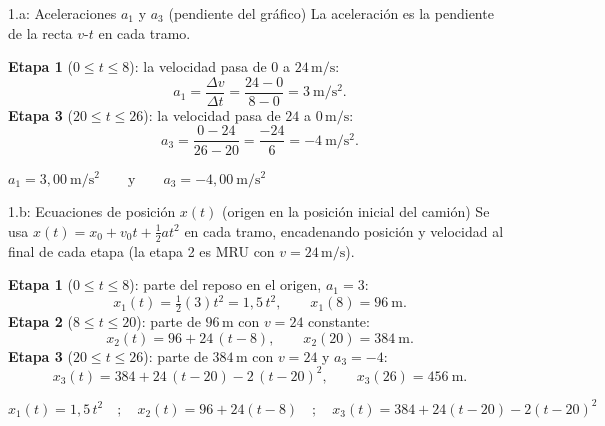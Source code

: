 \documentclass[letterpaper, 11pt]{article}
\begin{document}
\begin{paso}{1.a: Aceleraciones $a_1$ y $a_3$ (pendiente del gr\'afico)}
La aceleraci\'on es la pendiente de la recta $v$-$t$ en cada tramo.

\textbf{Etapa 1} ($0\le t\le 8$): la velocidad pasa de $0$ a $24\,\mathrm{m/s}$:
\[
a_1=\frac{\Delta v}{\Delta t}=\frac{24-0}{8-0}=3\ \mathrm{m/s^2}.
\]
\textbf{Etapa 3} ($20\le t\le 26$): la velocidad pasa de $24$ a $0\,\mathrm{m/s}$:
\[
a_3=\frac{0-24}{26-20}=\frac{-24}{6}=-4\ \mathrm{m/s^2}.
\]
\begin{resultado}\centering
$\displaystyle a_1 = 3{,}00\ \mathrm{m/s^2}\qquad\text{y}\qquad a_3 = -4{,}00\ \mathrm{m/s^2}$
\end{resultado}
\end{paso}

\begin{paso}{1.b: Ecuaciones de posici\'on $x(t)$ (origen en la posici\'on inicial del cami\'on)}
Se usa $x(t)=x_0+v_0 t+\tfrac12 a t^2$ en cada tramo, encadenando posici\'on y
velocidad al final de cada etapa (la etapa 2 es MRU con $v=24\,\mathrm{m/s}$).

\textbf{Etapa 1} ($0\le t\le 8$): parte del reposo en el origen, $a_1=3$:
\[
x_1(t)=\tfrac12(3)t^2=1{,}5\,t^2,\qquad x_1(8)=96\ \mathrm{m}.
\]
\textbf{Etapa 2} ($8\le t\le 20$): parte de $96\,\mathrm{m}$ con $v=24$ constante:
\[
x_2(t)=96+24\,(t-8),\qquad x_2(20)=384\ \mathrm{m}.
\]
\textbf{Etapa 3} ($20\le t\le 26$): parte de $384\,\mathrm{m}$ con $v=24$ y $a_3=-4$:
\[
x_3(t)=384+24\,(t-20)-2\,(t-20)^2,\qquad x_3(26)=456\ \mathrm{m}.
\]
\begin{resultado}\centering
$\displaystyle x_1(t)=1{,}5\,t^2\quad;\quad x_2(t)=96+24(t-8)\quad;\quad x_3(t)=384+24(t-20)-2(t-20)^2$
\end{resultado}
\end{paso}
\end{document}
